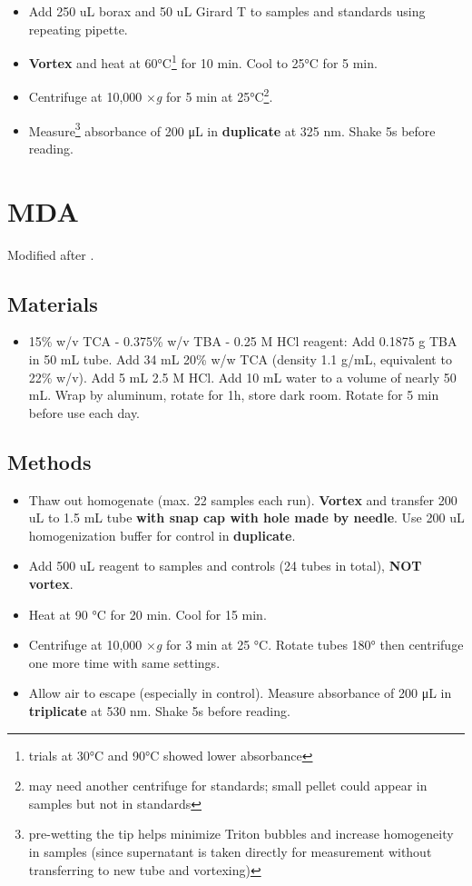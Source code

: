 \documentclass[
]{book}
\providecommand{\tightlist}{%
  \setlength{\itemsep}{0pt}\setlength{\parskip}{0pt}}
\begin{document}
\begin{itemize}
\tightlist
\item
  Add 250 uL borax and 50 uL Girard T to samples and standards using repeating pipette.
\item
  \textbf{Vortex} and heat at 60°C\footnote{trials at 30°C and 90°C showed lower absorbance} for 10 min. Cool to 25°C for 5 min.
\item
  Centrifuge at 10,000 ×\emph{g} for 5 min at 25°C\footnote{may need another centrifuge for standards; small pellet could appear in samples but not in standards}.
\item
  Measure\footnote{pre-wetting the tip helps minimize Triton bubbles and increase homogeneity in samples (since supernatant is taken directly for measurement without transferring to new tube and vortexing)} absorbance of 200 μL in \textbf{duplicate} at 325 nm. Shake 5s before reading.
\end{itemize}

\hypertarget{MDA}{%
\chapter{MDA}\label{MDA}}

Modified after \textcite{buege1978}.

\hypertarget{materials-6}{%
\section{Materials}\label{materials-6}}

\begin{itemize}
\tightlist
\item
  15\% w/v TCA - 0.375\% w/v TBA - 0.25 M HCl reagent: Add 0.1875 g TBA in 50 mL tube. Add 34 mL 20\% w/w TCA (density 1.1 g/mL, equivalent to 22\% w/v). Add 5 mL 2.5 M HCl. Add 10 mL water to a volume of nearly 50 mL. Wrap by aluminum, rotate for 1h, store dark room. Rotate for 5 min before use each day.
\end{itemize}

\hypertarget{methods-6}{%
\section{Methods}\label{methods-6}}

\begin{itemize}
\tightlist
\item
  Thaw out homogenate (max. 22 samples each run). \textbf{Vortex} and transfer 200 uL to 1.5 mL tube \textbf{with snap cap with hole made by needle}. Use 200 uL homogenization buffer for control in \textbf{duplicate}.
\item
  Add 500 uL reagent to samples and controls (24 tubes in total), \textbf{NOT vortex}.
\item
  Heat at 90 °C for 20 min. Cool for 15 min.
\item
  Centrifuge at 10,000 ×\emph{g} for 3 min at 25 °C. Rotate tubes 180° then centrifuge one more time with same settings.
\item
  Allow air to escape (especially in control). Measure absorbance of 200 μL in \textbf{triplicate} at 530 nm. Shake 5s before reading.
\end{itemize}
\end{document}
